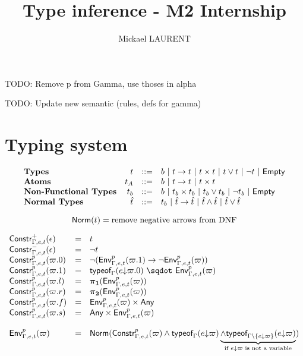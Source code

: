 \documentclass[a4paper]{article}
\title{\vspace{1.5cm}Type inference - M2 Internship}
\author{Mickael LAURENT}
\date{\vspace{-5ex}}
\theoremstyle{definition}
\begin{document}
    \maketitle

    TODO: Remove p from Gamma, use thoses in alpha

    TODO: Update new semantic (rules, defs for gamma)

    \section{Typing system}

    \[
      \begin{array}{lrcl}
      \textbf{Types} & t & ::= & b~|~ t\to t~|~ t\times t~|~ t\vee t ~|~ \neg t ~|~ \textsf{Empty}\\
      \textbf{Atoms} & t_A & ::= & b~|~ t\to t~|~ t\times t\\
      \textbf{Non-Functional Types} & t_b & ::= & b ~|~ t_b\times t_b ~|~ t_b\vee t_b ~|~ \neg t_b ~|~ \textsf{Empty}\\
      \textbf{Normal Types} & \hat t & ::= & t_b ~|~ \hat t\to \hat t~|~ \hat t \wedge \hat t ~|~ \hat t\vee \hat t
      \end{array}
    \]

    \[
      \textsf{Norm}(t) = \text{remove negative arrows from DNF}
    \]

    \[
    \begin{array}{lcl}
      \typep+\epsilon{\Gamma,e,t} & = & t\\
      \typep-\epsilon{\Gamma,e,t} & = & \neg t\\
      \typep{p}{\varpi.0}{\Gamma,e,t} & = & \neg(\arrow{\Gp p{\Gamma,e,t}{(\varpi.1)}}{\neg \Gp p {\Gamma,e,t} (\varpi)})\\
      \typep{p}{\varpi.1}{\Gamma,e,t} & = & \worra{\tyof{\occ e{\varpi.0}}\Gamma}{\Gp p {\Gamma,e,t} (\varpi)}\\
      \typep{p}{\varpi.l}{\Gamma,e,t} & = & \bpl{\Gp p {\Gamma,e,t} (\varpi)}\\
      \typep{p}{\varpi.r}{\Gamma,e,t} & = & \bpr{\Gp p {\Gamma,e,t} (\varpi)}\\
      \typep{p}{\varpi.f}{\Gamma,e,t} & = & \pair{\Gp p {\Gamma,e,t} (\varpi)}\Any\\
      \typep{p}{\varpi.s}{\Gamma,e,t} & = & \pair\Any{\Gp p {\Gamma,e,t} (\varpi)}\\ \\
      \Gp p {\Gamma,e,t} (\varpi) & = & \norm {\typep p \varpi {\Gamma,e,t} \land \tyof {\occ e \varpi} \Gamma
      \underbrace{\land \tyof {\occ e \varpi} {\Gamma\setminus\{\occ e \varpi\}}}_\text{if $\occ e \varpi$ is not a variable}}\\
    \end{array}
    \]
\end{document}
